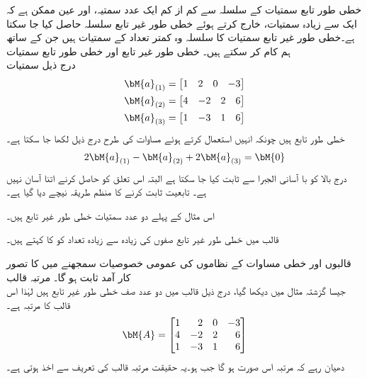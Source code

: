 خطی طور تابع سمتیات کے سلسلہ سے کم از کم ایک عدد سمتیہ، اور عین ممکن ہے کہ ایک سے زیادہ سمتیات، خارج کرتے ہوئے خطی طور غیر تابع سلسلہ حاصل کیا جا سکتا ہے۔خطی طور غیر تابع سمتیات کا سلسلہ وہ کمتر تعداد کے سمتیات ہیں جن کے ساتھ ہم کام کر سکتے ہیں۔
\quad خطی طور غیر تابع اور خطی طور تابع سمتیات\\
درج ذیل سمتیات 
\begin{align*}
\bM{a}_{(1)}&=\begin{bmatrix*}[r] 1&2&0&-3  \end{bmatrix*}\\
\bM{a}_{(2)}&=\begin{bmatrix*}[r] 4&-2&2&6  \end{bmatrix*}\\
\bM{a}_{(3)}&=\begin{bmatrix*}[r] 1&-3&1&6  \end{bmatrix*}
\end{align*}
خطی طور تابع ہیں چونکہ انہیں استعمال کرتے ہوئے مساوات  کی طرح  درج ذیل لکھا جا سکتا ہے۔
\begin{align*}
2\bM{a}_{(1)}-\bM{a}_{(2)}+2\bM{a}_{(3)}=\bM{0}
\end{align*}
درج بالا کو با آسانی الجبرا سے ثابت کیا جا سکتا ہے البتہ اس تعلق کو حاصل کرنے اتنا آسان نہیں ہے۔ تابعیت ثابت کرنے کا منظم طریقہ نیچے دیا گیا ہے۔ 

اس مثال کے پہلے دو عدد سمتیات خطی طور غیر تابع ہیں۔

قالب  میں خطی طور غیر تابع صفوں کی زیادہ سے زیادہ تعداد  کو  کا  کہتے ہیں۔ 

قالبوں  اور خطی مساوات کے نظاموں کی عمومی خصوصیات سمجھنے  میں  کا تصور  کار آمد ثابت ہو گا۔ 
\quad مرتبہ قالب\\
جیسا گزشتہ مثال میں دیکھا گیا، درج ذیل قالب میں دو عدد صف خطی طور غیر تابع ہیں لہٰذا اس قالب  کا مرتبہ  ہے۔
\begin{align*}
\bM{A}=\begin{bmatrix*}[r] 1&2&0&-3\\4&-2&2&6\\1&-3&1&6 \end{bmatrix*}
\end{align*}
دھیان رہے کہ مرتبہ  اس صورت  ہو گا جب  ہو۔یہ حقیقت مرتبہ قالب کی تعریف سے اخذ ہوتی ہے۔ 

